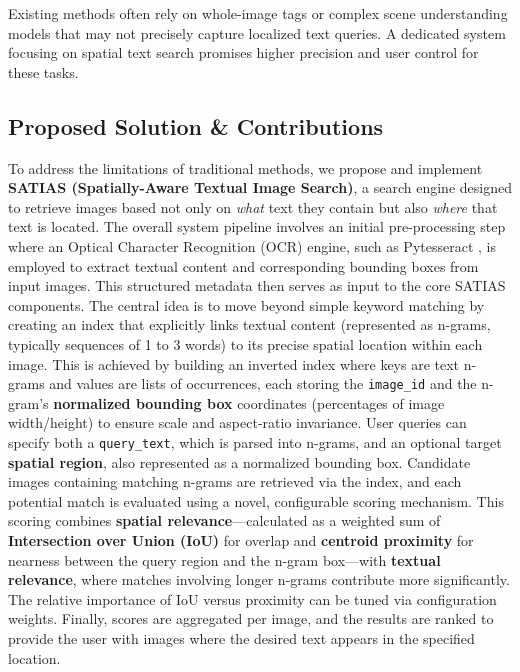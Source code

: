 \documentclass[manuscript,screen]{acmart}
\begin{document}
Existing methods often rely on whole-image tags or complex scene understanding models that may not precisely capture localized text queries. A dedicated system focusing on spatial text search promises higher precision and user control for these tasks.

\subsection{Proposed Solution \& Contributions}

To address the limitations of traditional methods, we propose and implement \textbf{SATIAS (Spatially-Aware Textual Image Search)}, a search engine designed to retrieve images based not only on \textit{what} text they contain but also \textit{where} that text is located. The overall system pipeline involves an initial pre-processing step where an Optical Character Recognition (OCR) engine, such as Pytesseract \cite{Smith2007AnOV}, is employed to extract textual content and corresponding bounding boxes from input images. This structured metadata then serves as input to the core SATIAS components. The central idea is to move beyond simple keyword matching by creating an index that explicitly links textual content (represented as n-grams, typically sequences of 1 to 3 words) to its precise spatial location within each image. This is achieved by building an inverted index where keys are text n-grams and values are lists of occurrences, each storing the \texttt{image\_id} and the n-gram's \textbf{normalized bounding box} coordinates (percentages of image width/height) to ensure scale and aspect-ratio invariance. User queries can specify both a \texttt{query\_text}, which is parsed into n-grams, and an optional target \textbf{spatial region}, also represented as a normalized bounding box. Candidate images containing matching n-grams are retrieved via the index, and each potential match is evaluated using a novel, configurable scoring mechanism. This scoring combines \textbf{spatial relevance}—calculated as a weighted sum of \textbf{Intersection over Union (IoU)} for overlap and \textbf{centroid proximity} for nearness between the query region and the n-gram box—with \textbf{textual relevance}, where matches involving longer n-grams contribute more significantly. The relative importance of IoU versus proximity can be tuned via configuration weights. Finally, scores are aggregated per image, and the results are ranked to provide the user with images where the desired text appears in the specified location.
\end{document}
